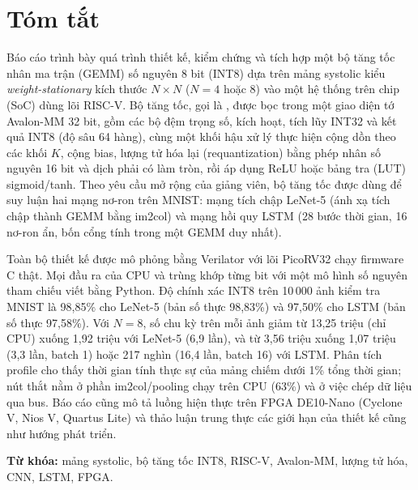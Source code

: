 \chapter*{Tóm tắt}
Báo cáo trình bày quá trình thiết kế, kiểm chứng và tích hợp một bộ tăng tốc nhân ma trận (GEMM) số nguyên 8 bit (INT8) dựa trên mảng systolic kiểu \emph{weight-stationary} kích thước $N\times N$ ($N=4$ hoặc $8$) vào một hệ thống trên chip (SoC) dùng lõi RISC-V. Bộ tăng tốc, gọi là \NPU{}, được bọc trong một giao diện tớ Avalon-MM 32 bit, gồm các bộ đệm trọng số, kích hoạt, tích lũy INT32 và kết quả INT8 (độ sâu 64 hàng), cùng một khối hậu xử lý thực hiện cộng dồn theo các khối $K$, cộng bias, lượng tử hóa lại (requantization) bằng phép nhân số nguyên 16 bit và dịch phải có làm tròn, rồi áp dụng ReLU hoặc bảng tra (LUT) sigmoid/tanh. Theo yêu cầu mở rộng của giảng viên, bộ tăng tốc được dùng để suy luận hai mạng nơ-ron trên MNIST: mạng tích chập LeNet-5 (ánh xạ tích chập thành GEMM bằng im2col) và mạng hồi quy LSTM (28 bước thời gian, 16 nơ-ron ẩn, bốn cổng tính trong một GEMM duy nhất).

Toàn bộ thiết kế được mô phỏng bằng Verilator với lõi PicoRV32 chạy firmware C thật. Mọi đầu ra của CPU và \NPU{} trùng khớp từng bit với một mô hình số nguyên tham chiếu viết bằng Python. Độ chính xác INT8 trên 10\,000 ảnh kiểm tra MNIST là 98,85\% cho LeNet-5 (bản số thực 98,83\%) và 97,50\% cho LSTM (bản số thực 97,58\%). Với $N=8$, số chu kỳ trên mỗi ảnh giảm từ 13,25 triệu (chỉ CPU) xuống 1,92 triệu với LeNet-5 (6,9 lần), và từ 3,56 triệu xuống 1,07 triệu (3,3 lần, batch 1) hoặc 217 nghìn (16,4 lần, batch 16) với LSTM. Phân tích profile cho thấy thời gian tính thực sự của mảng chiếm dưới 1\% tổng thời gian; nút thắt nằm ở phần im2col/pooling chạy trên CPU (63\%) và ở việc chép dữ liệu qua bus. Báo cáo cũng mô tả luồng hiện thực trên FPGA DE10-Nano (Cyclone V, Nios V, Quartus Lite) và thảo luận trung thực các giới hạn của thiết kế cũng như hướng phát triển.

\vspace{0.3cm}
\noindent\textbf{Từ khóa:} mảng systolic, bộ tăng tốc INT8, RISC-V, Avalon-MM, lượng tử hóa, CNN, LSTM, FPGA.

